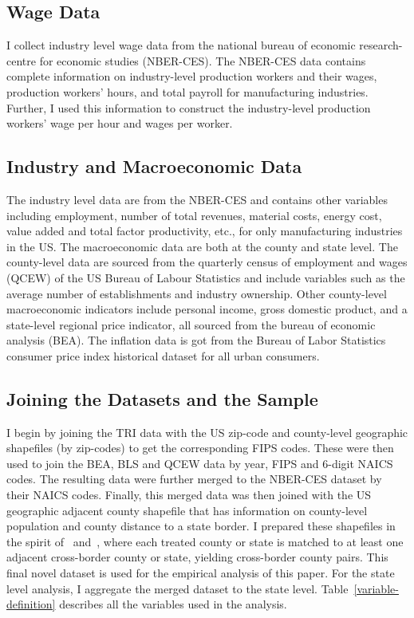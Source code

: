\documentclass[12pt, english]{article}
\begin{document}
    \subsection{Wage Data}\label{subsec:wage-data}
    I collect industry level wage data from the national bureau of economic research-centre for economic studies (NBER-CES). The NBER-CES data contains complete information on industry-level production workers and their wages, production workers' hours, and total payroll for manufacturing industries. Further, I used this information to construct the industry-level production workers' wage per hour and wages per worker.

    \subsection{Industry and Macroeconomic Data}\label{subsec:industry-and-macroeconomic-data}
    The industry level data are from the NBER-CES and contains other variables including employment, number of total revenues, material costs, energy cost, value added and total factor productivity, etc., for only manufacturing industries in the US. The macroeconomic data are both at the county and state level. The county-level data are sourced from the quarterly census of employment and wages (QCEW) of the US Bureau of Labour Statistics and include variables such as the average number of establishments and industry ownership. Other county-level macroeconomic indicators include personal income, gross domestic product, and a state-level regional price indicator, all sourced from the bureau of economic analysis (BEA). The inflation data is got from the Bureau of Labor Statistics consumer price index historical dataset for all urban consumers.

    \subsection{Joining the Datasets and the Sample}\label{subsec:joining-the-datasets-and-the-sample}
    I begin by joining the TRI data with the US zip-code and county-level geographic shapefiles (by zip-codes) to get the corresponding FIPS codes. These were then used to join the BEA, BLS and QCEW data by year, FIPS and $6$-digit NAICS codes. The resulting data were further merged to the NBER-CES dataset by their NAICS codes. Finally, this merged data was then joined with the US geographic adjacent county shapefile that has information on county-level population and county distance to a state border. I prepared these shapefiles in the spirit of~\cite{dube2010minimum} and~\cite{gopalan2021state}, where each treated county or state is matched to at least one adjacent cross-border county or state, yielding cross-border county pairs. This final novel dataset is used for the empirical analysis of this paper. For the state level analysis, I aggregate the merged dataset to the state level. Table~\ref{variable-definition} describes all the variables used in the analysis.
\end{document}
